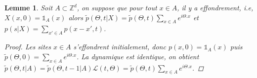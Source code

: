 \documentclass{article}
\newtheorem{lemma}[theorem]{Lemme}
\theoremstyle{definition}
\begin{document}
\begin{lemma}
	Soit $A\subset \mathbb{Z}^d$, on suppose que pour tout $x\in A$, il y a effondrement, i.e, $X(x, 0) = \mathds{1}_A(x)$ alors $\tilde{p}(\Theta, t|X) = \tilde{p}(\Theta, t)\sum_{x\in A}e^{i\Theta.x}$ et $p(s|X)=\sum_{x'\in A}p(x-x',t)$.
	\begin{proof}
		Les sites $x\in A$ s'effondrent initialement, donc $p(x,0) = \mathds{1}_A(x)$ puis $\tilde{p}(\Theta,0) =\sum_{x\in A}e^{i\Theta.x}$. La dynamique est identique, on obtient $\tilde{p}(\Theta, t|A) = \tilde{p}(\Theta, t-1|A)\mathcal{L}(t, \Theta) = \tilde{p}(\Theta, t) \sum_{x\in A} e^{i\Theta.x}$.
	\end{proof}
\end{lemma}
\end{document}

